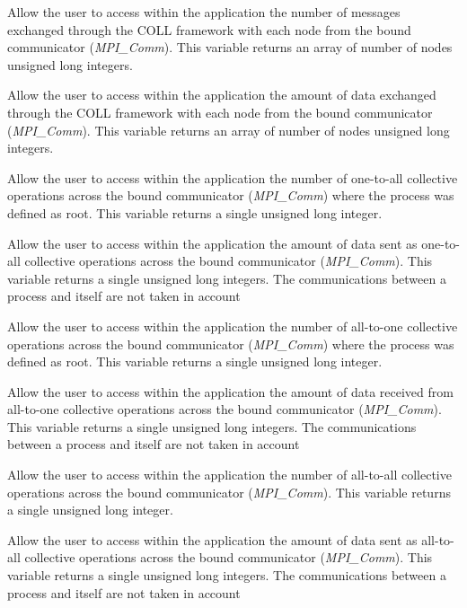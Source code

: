 \documentclass[notitlepage]{article}
\newcommand{\brkunds}[0]{\allowbreak\_}
\begin{document}
\begin{description}
  [\textit{coll\brkunds{}monitoring\brkunds{}messages\brkunds{}count}]
  Allow the user to access within the application the number of
  messages exchanged through the COLL framework with each node from
  the bound communicator (\textit{MPI\brkunds{}Comm}). This variable
  returns an array of number of nodes unsigned long integers.
\item
  [\textit{coll\brkunds{}monitoring\brkunds{}messages\brkunds{}size}]
  Allow the user to access within the application the amount of data
  exchanged through the COLL framework with each node from the bound
  communicator (\textit{MPI\brkunds{}Comm}). This variable returns an
  array of number of nodes unsigned long integers.
\item [\textit{coll\brkunds{}monitoring\brkunds{}o2a\brkunds{}count}]
  Allow the user to access within the application the number of
  one-to-all collective operations across the bound communicator
  (\textit{MPI\brkunds{}Comm}) where the process was defined as
  root. This variable returns a single unsigned long integer.
\item [\textit{coll\brkunds{}monitoring\brkunds{}o2a\brkunds{}size}]
  Allow the user to access within the application the amount of data
  sent as one-to-all collective operations across the bound
  communicator (\textit{MPI\brkunds{}Comm}). This variable returns a
  single unsigned long integers. The communications between a process
  and itself are not taken in account
\item [\textit{coll\brkunds{}monitoring\brkunds{}a2o\brkunds{}count}]
  Allow the user to access within the application the number of
  all-to-one collective operations across the bound communicator
  (\textit{MPI\brkunds{}Comm}) where the process was defined as
  root. This variable returns a single unsigned long integer.
\item [\textit{coll\brkunds{}monitoring\brkunds{}a2o\brkunds{}size}]
  Allow the user to access within the application the amount of data
  received from all-to-one collective operations across the bound
  communicator (\textit{MPI\brkunds{}Comm}). This variable returns a
  single unsigned long integers. The communications between a process
  and itself are not taken in account
\item [\textit{coll\brkunds{}monitoring\brkunds{}a2a\brkunds{}count}]
  Allow the user to access within the application the number of
  all-to-all collective operations across the bound communicator
  (\textit{MPI\brkunds{}Comm}). This variable returns a single
  unsigned long integer.
\item [\textit{coll\brkunds{}monitoring\brkunds{}a2a\brkunds{}size}]
  Allow the user to access within the application the amount of data
  sent as all-to-all collective operations across the bound
  communicator (\textit{MPI\brkunds{}Comm}). This variable returns a
  single unsigned long integers. The communications between a process
  and itself are not taken in account
\end{description}
\end{document}
